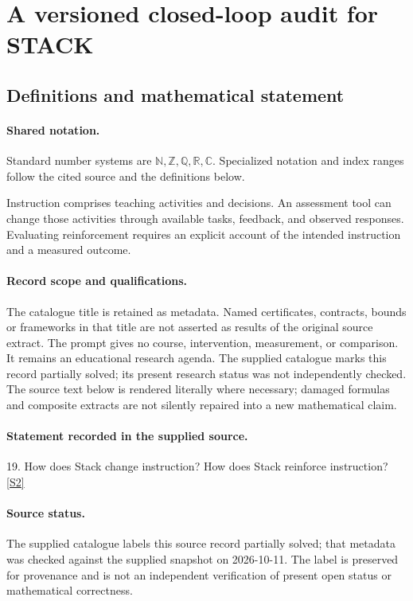 \documentclass[11pt]{article}
\newcommand{\sref}[2]{\hyperlink{source:#1:#2}{[S#2]}}
\begin{document}
\section{A versioned closed-loop audit for STACK}\label{statement}

\subsection{Definitions and mathematical statement}

\paragraph{Shared notation.}Standard number systems are $\mathbb N,\mathbb Z,\mathbb Q,\mathbb R,\mathbb C$. Specialized notation and index ranges follow the cited source and the definitions below.


Instruction comprises teaching activities and decisions. An assessment tool can change those activities through available tasks, feedback, and observed responses. Evaluating reinforcement requires an explicit account of the intended instruction and a measured outcome.
\paragraph{Record scope and qualifications.}
The catalogue title is retained as metadata. Named certificates, contracts, bounds or frameworks in that title are not asserted as results of the original source extract.
The prompt gives no course, intervention, measurement, or comparison. It remains an educational research agenda. The supplied catalogue marks this record partially solved; its present research status was not independently checked.
The source text below is rendered literally where necessary; damaged formulas and composite extracts are not silently repaired into a new mathematical claim.
\paragraph{Statement recorded in the supplied source.}
19. How does Stack change instruction? How does Stack reinforce instruction? \sref{statement}{2}
\paragraph{Source status.}
The supplied catalogue labels this source record partially solved; that metadata was checked against the supplied snapshot on 2026-10-11. The label is preserved for provenance and is not an independent verification of present open status or mathematical correctness.
\end{document}
